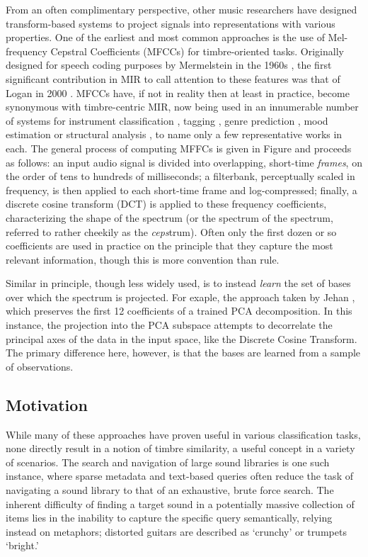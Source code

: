 From an often complimentary perspective, other music researchers have designed transform-based systems to project signals into representations with various properties.
One of the earliest and most common approaches is the use of Mel-frequency Cepstral Coefficients (MFCCs) for timbre-oriented tasks.
Originally designed for speech coding purposes by Mermelstein in the 1960s \cite{Mermelstein}, the first significant contribution in MIR to call attention to these features was that of Logan in 2000 \cite{Logan}.
MFCCs have, if not in reality then at least in practice, become synonymous with timbre-centric MIR, now being used in an innumerable number of systems for instrument classification \cite{}, tagging \cite{}, genre prediction \cite{}, mood estimation \cite{} or structural analysis \cite{}, to name only a few representative works in each.
The general process of computing MFFCs is given in Figure and proceeds as follows: an input audio signal is divided into overlapping, short-time \emph{frames}, on the order of tens to hundreds of milliseconds; a filterbank, perceptually scaled in frequency, is then applied to each short-time frame and log-compressed; finally, a discrete cosine transform (DCT) is applied to these frequency coefficients, characterizing the shape of the spectrum (or the spectrum of the spectrum, referred to rather cheekily as the \emph{ceps}trum).
Often only the first dozen or so coefficients are used in practice on the principle that they capture the most relevant information, though this is more convention than rule.

Similar in principle, though less widely used, is to instead \emph{learn} the set of bases over which the spectrum is projected.
For exaple, the approach taken by Jehan \cite{Jehan2005}, which preserves the first 12 coefficients of a trained PCA decomposition.
In this instance, the projection into the PCA subspace attempts to decorrelate the principal axes of the data in the input space, like the Discrete Cosine Transform.
The primary difference here, however, is that the bases are learned from a sample of observations.

\subsection{Motivation}

While many of these approaches have proven useful in various classification tasks, none directly result in a notion of timbre similarity, a useful concept in a variety of scenarios.
The search and navigation of large sound libraries is one such instance, where sparse metadata and text-based queries often reduce the task of navigating a sound library to that of an exhaustive, brute force search.
The inherent difficulty of finding a target sound in a potentially massive collection of items lies in the inability to capture the specific query semantically, relying instead on metaphors; distorted guitars are described as `crunchy' or trumpets `bright.'

